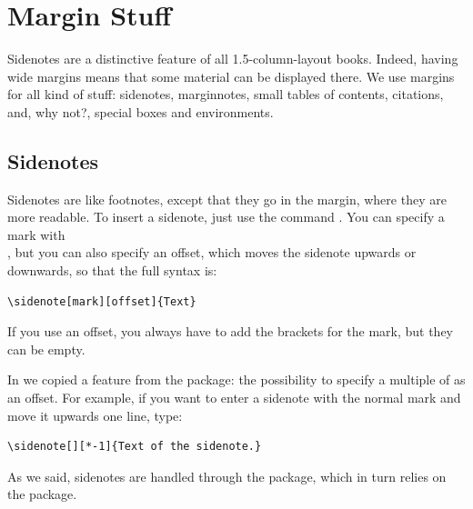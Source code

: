 \setchapterpreamble[u]{\margintoc}
\chapter{Margin Stuff}

Sidenotes are a distinctive feature of all 1.5-column-layout books. 
Indeed, having wide margins means that some material can be displayed 
there. We use margins for all kind of stuff: sidenotes, marginnotes, 
small tables of contents, citations, and, why not?, special boxes and 
environments.

\section{Sidenotes}

Sidenotes are like footnotes, except that they go in the margin, where 
they are more readable. To insert a sidenote, just use the command 
. You can specify a 
mark with \\ 
, but you can also specify an offset, 
which moves the sidenote upwards or downwards, so that the full syntax is:

\begin{lstlisting}[style=kaolstplain]
\sidenote[mark][offset]{Text}
\end{lstlisting}

If you use an offset, you always have to add the brackets for the mark, 
but they can be empty.

In  we copied a feature from the  
package: the possibility to specify a multiple of  
as an offset. For example, if you want to enter a sidenote with the 
normal mark and move it upwards one line, type:

\begin{lstlisting}[style=kaolstplain]
\sidenote[][*-1]{Text of the sidenote.}
\end{lstlisting}

As we said, sidenotes are handled through the  
package, which in turn relies on the  package.

